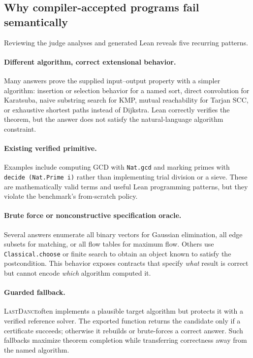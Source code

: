 \documentclass{article}
\newcommand{\lastdance}{\textsc{LastDance}}
\begin{document}
\subsection{Why compiler-accepted programs fail semantically}

Reviewing the judge analyses and generated Lean reveals five recurring patterns.

\paragraph{Different algorithm, correct extensional behavior.}
Many answers prove the supplied input--output property with a simpler algorithm:
insertion or selection behavior for a named sort, direct convolution for Karatsuba,
naive substring search for KMP, mutual reachability for Tarjan SCC, or exhaustive
shortest paths instead of Dijkstra.  Lean correctly verifies the theorem, but the answer
does not satisfy the natural-language algorithm constraint.

\paragraph{Existing verified primitive.}
Examples include computing GCD with \texttt{Nat.gcd} and marking primes with
\texttt{decide (Nat.Prime i)} rather than implementing trial division or a sieve.
These are mathematically valid terms and useful Lean programming patterns, but they
violate the benchmark's from-scratch policy.

\paragraph{Brute force or nonconstructive specification oracle.}
Several answers enumerate all binary vectors for Gaussian elimination, all edge subsets
for matching, or all flow tables for maximum flow.  Others use \texttt{Classical.choose}
or finite search to obtain an object known to satisfy the postcondition.  This behavior
exposes contracts that specify \emph{what} result is correct but cannot encode
\emph{which} algorithm computed it.

\paragraph{Guarded fallback.}
\lastdance often implements a plausible target algorithm but protects it with a
verified reference solver.  The exported function returns the candidate only if a
certificate succeeds; otherwise it rebuilds or brute-forces a correct answer.  Such
fallbacks maximize theorem completion while transferring correctness away from the
named algorithm.
\end{document}
